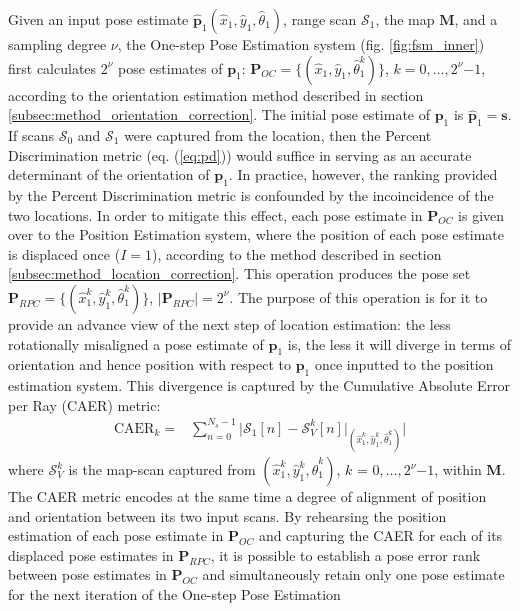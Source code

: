 Given an input pose estimate $\hat{\bm{p}}_1(\hat{x}_1, \hat{y}_1,
\hat{\theta}_1)$, range scan $\mathcal{S}_1$, the map $\bm{M}$, and a sampling
degree $\nu$, the One-step Pose Estimation system (fig. \ref{fig:fsm_inner})
first calculates $2^\nu$ pose estimates of $\bm{p}_1$: $\bm{P}_{OC} =
\{(\hat{x}_1, \hat{y}_1, \hat{\theta}_1^k)\}$, $k = 0,\dots,2^\nu$$-$$1$,
according to the orientation estimation method described in section
\ref{subsec:method_orientation_correction}. The initial pose estimate of
$\bm{p}_1$ is $\hat{\bm{p}}_1 = \bm{s}$.
If scans $\mathcal{S}_0$ and
$\mathcal{S}_1$ were captured from the location, then the Percent
Discrimination metric (eq. (\ref{eq:pd})) would suffice in serving as an
accurate determinant of the orientation of $\bm{p}_1$. In practice, however,
the ranking provided by the Percent Discrimination metric is confounded by the
incoincidence of the two locations. In order to mitigate this effect, each pose
estimate in $\bm{P}_{OC}$ is given over to the Position Estimation system,
where the position of each pose estimate is displaced once ($I=1$), according
to the method described in section \ref{subsec:method_location_correction}.
This operation produces the pose set
$\bm{P}_{RPC} = \{(\hat{x}_1^k, \hat{y}_1^k, \hat{\theta}_1^k)\}$,
$|\bm{P}_{RPC}| = 2^\nu$. The purpose of this operation is for it to provide an
advance view of the next step of location estimation: the less rotationally
misaligned a pose estimate of $\bm{p}_1$ is, the less it will diverge in terms
of orientation and hence position with respect to $\bm{p}_1$ once inputted to
the position estimation system. This divergence is captured by the Cumulative
Absolute Error per Ray (CAER) metric:
\begin{align}
  \text{CAER}_k = & \sum\limits_{n=0}^{N_s-1} \Bigg| \mathcal{S}_1[n] - \mathcal{S}_V^k[n]\Big|_{(\hat{x}_1^k, \hat{y}_1^k, \hat{\theta}_1^k)} \Bigg|
  \label{eq:caer}
\end{align}
where $\mathcal{S}_V^k$ is the map-scan captured from
$(\hat{x}_1^k, \hat{y}_1^k, \hat{\theta}_1^k)$, $k$ = $0,\dots,2^\nu$$-$$1$, within $\bm{M}$. The CAER metric
encodes at the same time a degree of alignment of position and orientation
between its two input scans. By rehearsing the position estimation of each pose
estimate in $\bm{P}_{OC}$ and capturing the CAER for each of its displaced pose
estimates in $\bm{P}_{RPC}$, it is possible to establish a pose error rank
between pose estimates in $\bm{P}_{OC}$ and simultaneously retain only one pose
estimate for the next iteration of the One-step Pose Estimation
